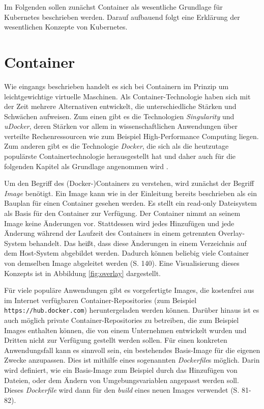 \documentclass[11pt,a4paper]{article}
\begin{document}
Im Folgenden sollen zunächst Container als wesentliche Grundlage für Kubernetes
beschrieben werden.
Darauf aufbauend folgt eine Erklärung der wesentlichen Konzepte von Kubernetes.

\section{Container}
\label{sec:Container}
Wie eingangs beschrieben handelt es sich bei Containern im Prinzip um leichtgewichtige virtuelle Maschinen.
Als Container-Technologie haben sich mit der Zeit mehrere Alternativen entwickelt, die unterschiedliche
Stärken und Schwächen aufweisen. Zum einen gibt es die Technologien \emph{Singularity} und \emph{uDocker}, deren Stärken
vor allem in wissenschaftlichen Anwendungen über verteilte Rechenressourcen wie zum Beispiel High-Performance Computing
liegen. Zum anderen gibt es die Technologie \emph{Docker}, die sich als die heutzutage populärste Containertechnologie
herausgestellt hat und daher auch für die folgenden Kapitel als Grundlage angenommen wird \cite{Bentaleb_Belloum_Sebaa_El-Maouhab_2021}.

Um den Begriff des (Docker-)Containers zu verstehen, wird zunächst der Begriff \emph{Image} benötigt.
Ein Image kann wie in der Einleitung bereits beschrieben als ein Bauplan für einen Container gesehen werden.
Es stellt ein read-only Dateisystem als Basis für den Container zur Verfügung. Der Container nimmt an seinem Image
keine Änderungen vor. Stattdessen wird jedes Hinzufügen und jede Änderung während der Laufzeit des Containers in einem
getrennten Overlay-System behandelt.
Das heißt, dass diese Änderungen in einem Verzeichnis auf dem Host-System abgebildet werden.
Dadurch können beliebig viele Container von demselben Image abgeleitet werden \cite{kofler2021docker} (S. 140).
Eine Visualisierung dieses Konzepts ist in Abbildung \ref{fig:overlay} dargestellt.


Für viele populäre Anwendungen gibt es vorgefertigte Images, die kostenfrei aus im Internet verfügbaren
Container-Repositories (zum Beispiel \lstinline|https://hub.docker.com|) heruntergeladen werden können.
Darüber hinaus ist es auch möglich private Container-Repositories zu betreiben,
die zum Beispiel Images enthalten können, die von einem Unternehmen entwickelt wurden
und Dritten nicht zur Verfügung gestellt werden sollen.
Für einen konkreten Anwendungsfall kann es sinnvoll sein, ein bestehendes Basis-Image für die eigenen Zwecke anzupassen.
Dies ist mithilfe eines sogenannten \emph{Dockerfile}s möglich. Darin wird definiert, wie ein Basis-Image
zum Beispiel durch das Hinzufügen von Dateien,
oder dem Ändern von Umgebungsvariablen angepasst werden soll. Dieses \emph{Dockerfile} wird dann für den \emph{build}
eines neuen Images verwendet \cite{kofler2021docker} (S. 81-82).
\end{document}
